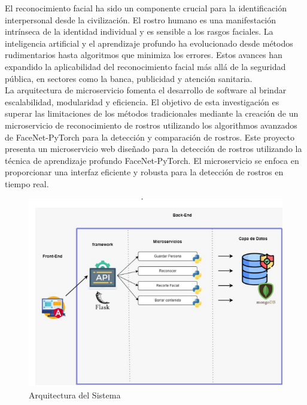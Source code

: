 \documentclass[12pt]{article}
\begin{document}
El reconocimiento facial ha sido un componente crucial para la identificación interpersonal desde la civilización. El rostro humano es una manifestación intrínseca de la identidad individual y es sensible a los rasgos faciales. La inteligencia artificial y el aprendizaje profundo ha evolucionado desde métodos rudimentarios hasta algoritmos que minimiza los errores. Estos avances han expandido la aplicabilidad del reconocimiento facial más allá de la seguridad pública, en sectores como la banca, publicidad y atención sanitaria.\\
La arquitectura de microservicio fomenta el desarrollo de software al brindar escalabilidad, modularidad y eficiencia. El objetivo de esta investigación es superar las limitaciones de los métodos tradicionales mediante la creación de un microservicio de reconocimiento de rostros utilizando los algorithmos avanzados de FaceNet-PyTorch para la detección y comparación de rostros.
Este proyecto presenta un microservicio web diseñado para la detección de rostros utilizando la técnica de aprendizaje profundo FaceNet-PyTorch. El microservicio se enfoca en proporcionar una interfaz eficiente y robusta para la detección de rostros en tiempo real.
\begin{figure}
	    \centering
	    \includegraphics[width=0.6\linewidth]{image.png}
	    \caption{Arquitectura del Sistema}
	    \label{fig:enter-label}
	\end{figure}	
\end{document}
